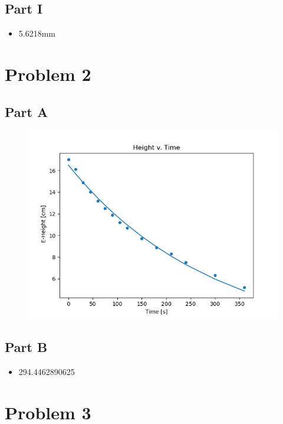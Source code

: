\documentclass[]{report}
\begin{document}
	\subsection{Part I}
	
	\begin{itemize}
		\item 5.6218mm
	\end{itemize}
	
	\newpage
	
	\section{Problem 2}
	
	\subsection{Part A}
	
		\begin{figure}[h]
		\centering
		\includegraphics[width=0.7\linewidth]{pics/2}
		\label{fig:2}
	\end{figure}
	
	\subsection{Part B}


	\begin{itemize}
		\item 294.4462890625
	\end{itemize}
	
	
	\newpage
	
	\section{Problem 3}
	
\end{document}
